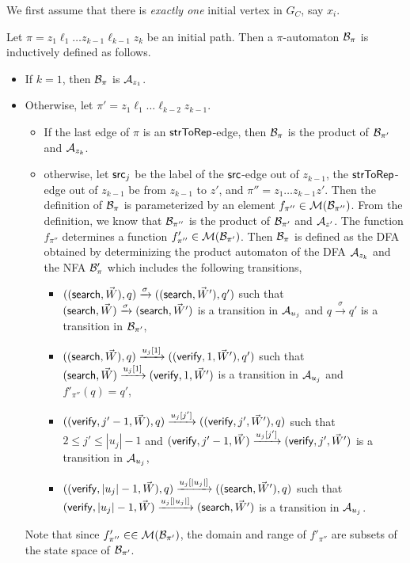 \documentclass{llncs}
\begin{document}
We first assume that there is \emph{exactly  one} initial vertex in $G_C$, say $x_i$. 


\begin{definition}[$\pi$-automaton]\label{def-pi-aut}
Let $\pi=z_1 \ell_1 \dots z_{k-1} \ell_{k-1} z_k$ be an initial path.  Then a $\pi$-automaton $\mathcal{B}_\pi$ is inductively defined as follows. 
\begin{itemize}
\item If $k=1$, then $\mathcal{B}_\pi$ is $\mathcal{A}_{z_1}$.
%
\item Otherwise, let $\pi' = z_1 \ell_1 \dots \ell_{k-2}z_{k-1}$.
\begin{itemize} 
\item If the last edge of $\pi$ is an $\mathsf{strToRep}$-edge, then $\mathcal{B}_\pi$ is the product of $\mathcal{B}_{\pi'}$ and $\mathcal{A}_{z_k}$.

\item otherwise, let $\mathsf{src}_j$ be the label of the $\mathsf{src}$-edge out of $z_{k-1}$, the $\mathsf{strToRep}$-edge out of $z_{k-1}$ be from $z_{k-1}$ to $z'$, and $\pi'' = z_1 \dots z_{k-1} z'$. Then the definition of $\mathcal{B}_\pi$ is parameterized by an element $f_{\pi''} \in \mathcal{M}(\mathcal{B}_{\pi''})$. From the definition, we know that $\mathcal{B}_{\pi''}$ is the product of $\mathcal{B}_{\pi'}$ and $\mathcal{A}_{z'}$. The function $f_{\pi''}$ determines a function $f'_{\pi''} \in \mathcal{M}(\mathcal{B}_{\pi'})$. Then $\mathcal{B}_\pi$ is defined as the DFA obtained by determinizing the product automaton of the DFA $\mathcal{A}_{z_k}$ and the NFA $\mathcal{B}'_{\pi}$ which includes the following transitions,
\begin{itemize}
\item $((\mathsf{search}, \vec{W}), q) \xrightarrow{\sigma} ((\mathsf{search}, \vec{W}'), q')$ such that $(\mathsf{search}, \vec{W}) \xrightarrow{\sigma} (\mathsf{search}, \vec{W}')$ is a transition in $\mathcal{A}_{u_j}$ and $q \xrightarrow{\sigma} q'$ is a transition in $\mathcal{B}_{\pi'}$,
\item $((\mathsf{search}, \vec{W}), q) \xrightarrow{u_j[1]} ((\mathsf{verify}, 1, \vec{W}'), q')$ such that  $(\mathsf{search}, \vec{W}) \xrightarrow{u_j[1]} (\mathsf{verify},1,  \vec{W}')$ is a transition in $\mathcal{A}_{u_j}$ and $f'_{\pi''}(q)=q'$,
\item $((\mathsf{verify}, j'-1, \vec{W}), q) \xrightarrow{u_j[j']} ((\mathsf{verify}, j', \vec{W}'), q)$ such that $2 \le j' \le |u_j |-1$ and $(\mathsf{verify}, j'-1, \vec{W}) \xrightarrow{u_j[j']} (\mathsf{verify},j',  \vec{W}')$ is a transition in $\mathcal{A}_{u_j}$,
\item $((\mathsf{verify}, |u_j|-1, \vec{W}),q) \xrightarrow{u_j[|u_j|]} ((\mathsf{search}, \vec{W}'),q)$ such that $(\mathsf{verify}, |u_j|-1, \vec{W}) \xrightarrow{u_j[|u_j|]} (\mathsf{search}, \vec{W}')$ is a transition in $\mathcal{A}_{u_j}$.
\end{itemize}
\end{itemize}
Note that since $f'_{\pi''} \in  \in \mathcal{M}(\mathcal{B}_{\pi'})$, the domain and range of $f'_{\pi''}$ are subsets of the state space of $\mathcal{B}_{\pi'}$. 
\end{itemize}
\end{definition}
\end{document}
